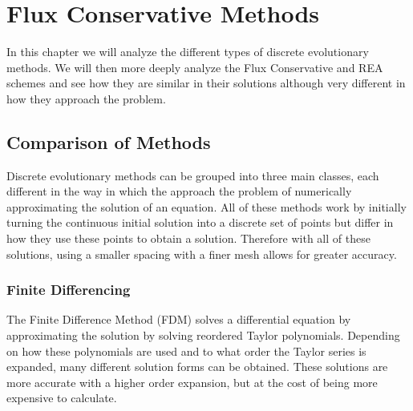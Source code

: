 \chapter{Flux Conservative Methods}
In this chapter we will analyze the different types of discrete evolutionary methods. We will then more deeply analyze the Flux Conservative and REA schemes and see how they are similar in  their solutions although very different in how they approach the problem.
\section{Comparison of Methods}
Discrete evolutionary methods can be grouped into three main classes, each different in the way in which the approach the problem of numerically approximating the solution of an equation. All of these methods work by initially turning the continuous initial solution into a discrete set of points but differ in how they use these points to obtain a solution. Therefore with all of these solutions, using a smaller spacing with a finer mesh allows for greater accuracy.
\subsection{Finite Differencing}
The Finite Difference Method (FDM) solves a differential equation by approximating the solution by solving reordered Taylor polynomials. Depending on how these polynomials are used and to what order the Taylor series is expanded, many different solution forms can be obtained. These solutions are more accurate with a higher order expansion, but at the cost of being more expensive to calculate.
